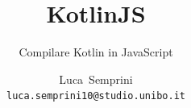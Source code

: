 \title[KotlinJs]{%
    KotlinJS
}
\subtitle[Compilare Kotlin in JavaScript]{%
    Compilare Kotlin in JavaScript
}

\author[Luca~Semprini]{\large{Luca~Semprini}\\\medskip\small{\texttt{luca.semprini10@studio.unibo.it}}}


\date[30 maggio 2018]{}


    \begin{frame}
        \titlepage
    \end{frame}
    \begin{frame}
      \tableofcontents
    \end{frame}

